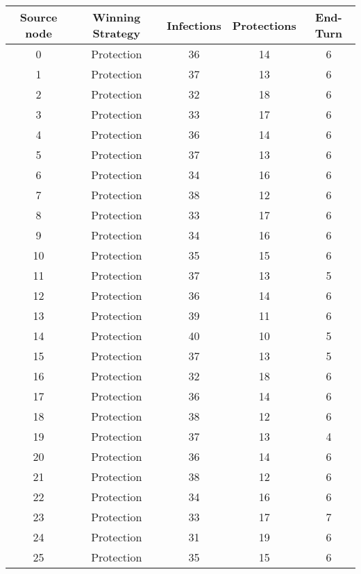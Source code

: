 \documentclass[results.tex]{subfiles}
\begin{document}
\begin{center}
  \begin{tabular}{| c || c | c | c | c |}
    \hline
    {\bfseries Source node} & {\bfseries Winning Strategy} & {\bfseries Infections} & {\bfseries Protections} & {\bfseries End-Turn} \\  %
    \hline\hline
    0 & Protection & 36 & 14 & 6 \\ 
    \hline
    1 & Protection & 37 & 13 & 6 \\ 
    \hline
    2 & Protection & 32 & 18 & 6 \\ 
    \hline
    3 & Protection & 33 & 17 & 6 \\ 
    \hline
    4 & Protection & 36 & 14 & 6 \\ 
    \hline
    5 & Protection & 37 & 13 & 6 \\ 
    \hline
    6 & Protection & 34 & 16 & 6 \\ 
    \hline
    7 & Protection & 38 & 12 & 6 \\ 
    \hline
    8 & Protection & 33 & 17 & 6 \\ 
    \hline
    9 & Protection & 34 & 16 & 6 \\ 
    \hline
    10 & Protection & 35 & 15 & 6 \\ 
    \hline
    11 & Protection & 37 & 13 & 5 \\ 
    \hline
    12 & Protection & 36 & 14 & 6 \\ 
    \hline
    13 & Protection & 39 & 11 & 6 \\ 
    \hline
    14 & Protection & 40 & 10 & 5 \\ 
    \hline
    15 & Protection & 37 & 13 & 5 \\ 
    \hline
    16 & Protection & 32 & 18 & 6 \\ 
    \hline
    17 & Protection & 36 & 14 & 6 \\ 
    \hline
    18 & Protection & 38 & 12 & 6 \\ 
    \hline
    19 & Protection & 37 & 13 & 4 \\ 
    \hline
    20 & Protection & 36 & 14 & 6 \\ 
    \hline
    21 & Protection & 38 & 12 & 6 \\ 
    \hline
    22 & Protection & 34 & 16 & 6 \\ 
    \hline
    23 & Protection & 33 & 17 & 7 \\ 
    \hline
    24 & Protection & 31 & 19 & 6 \\ 
    \hline
    25 & Protection & 35 & 15 & 6 \\ 

\end{tabular}
\end{center}
\end{document}
